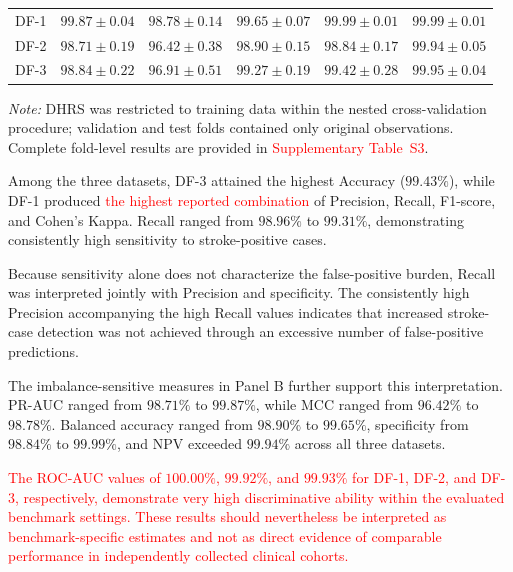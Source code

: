 \documentclass[pdflatex,sn-mathphys-num]{sn-jnl}%
\theoremstyle{thmstyleone}%
\theoremstyle{thmstyletwo}%
\theoremstyle{thmstylethree}%
\begin{document}
\begin{table}[!ht]
\begin{tabular}{@{}lccccc@{}}
DF-1 &
$99.87\pm0.04$ &
$98.78\pm0.14$ &
$99.65\pm0.07$ &
$99.99\pm0.01$ &
$99.99\pm0.01$ \\

DF-2 &
$98.71\pm0.19$ &
$96.42\pm0.38$ &
$98.90\pm0.15$ &
$98.84\pm0.17$ &
$99.94\pm0.05$ \\

DF-3 &
$98.84\pm0.22$ &
$96.91\pm0.51$ &
$99.27\pm0.19$ &
$99.42\pm0.28$ &
$99.95\pm0.04$ \\

\bottomrule
\end{tabular}

\endgroup

\vspace{2pt}

\begin{minipage}{0.98\textwidth}
\footnotesize
 {
\textit{Note:} DHRS was restricted to training data within the nested
cross-validation procedure; validation and test folds contained only original
observations. Complete fold-level
results are provided in \textcolor{red}{Supplementary Table~S3}.
}
\end{minipage}

\end{table}

Among the three datasets, DF-3 attained the highest Accuracy (\(99.43\%\)),
while DF-1 produced \textcolor{red}{
the highest reported combination} of Precision, Recall,
F1-score, and Cohen's Kappa. Recall ranged from \(98.96\%\) to \(99.31\%\),
demonstrating consistently high sensitivity to stroke-positive cases.

 {
Because sensitivity alone does not characterize the false-positive burden,
Recall was interpreted jointly with Precision and specificity. The consistently
high Precision accompanying the high Recall values indicates that increased
stroke-case detection was not achieved through an excessive number of
false-positive predictions.
}

 {
The imbalance-sensitive measures in Panel B further support this
interpretation. PR-AUC ranged from \(98.71\%\) to \(99.87\%\), while MCC
ranged from \(96.42\%\) to \(98.78\%\). Balanced accuracy ranged from
\(98.90\%\) to \(99.65\%\), specificity from \(98.84\%\) to \(99.99\%\),
and NPV exceeded \(99.94\%\) across all three datasets.
}

\textcolor{red}{
The ROC-AUC values of \(100.00\%\), \(99.92\%\), and \(99.93\%\) for DF-1,
DF-2, and DF-3, respectively, demonstrate very high discriminative ability
within the evaluated benchmark settings. These results should nevertheless be
interpreted as benchmark-specific estimates and not as direct evidence of
comparable performance in independently collected clinical cohorts.
}
\end{document}
